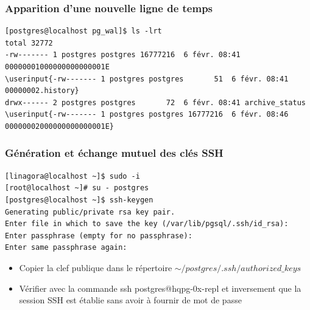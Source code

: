 
\begin{frame}[fragile]\frametitle{Apparition d'une nouvelle ligne de temps}

\begin{tiny}
\begin{Verbatim}[commandchars=\\\{\}]
[postgres@localhost pg_wal]$ ls -lrt
total 32772
-rw------- 1 postgres postgres 16777216  6 févr. 08:41 00000001000000000000001E
\userinput{-rw------- 1 postgres postgres       51  6 févr. 08:41 00000002.history}
drwx------ 2 postgres postgres       72  6 févr. 08:41 archive_status
\userinput{-rw------- 1 postgres postgres 16777216  6 févr. 08:46 00000002000000000000001E}
\end{Verbatim}
\end{tiny}

\end{frame}


\begin{frame}[fragile]\frametitle{Génération et échange mutuel des clés SSH}
\label{sec:ssh-keys}

\begin{tiny}
\begin{verbatim}
[linagora@localhost ~]$ sudo -i
[root@localhost ~]# su - postgres
[postgres@localhost ~]$ ssh-keygen 
Generating public/private rsa key pair.
Enter file in which to save the key (/var/lib/pgsql/.ssh/id_rsa): 
Enter passphrase (empty for no passphrase): 
Enter same passphrase again: 
\end{verbatim}
\end{tiny}

\begin{itemize}
   \item Copier la clef publique dans le répertoire $\sim/postgres/.ssh/authorized\_keys$
   \item Vérifier avec la commande ssh \textsf{postgres@hqpg-0x-repl} et inversement que la session SSH est établie sans avoir à fournir de mot de passe
\end{itemize}

\end{frame}


